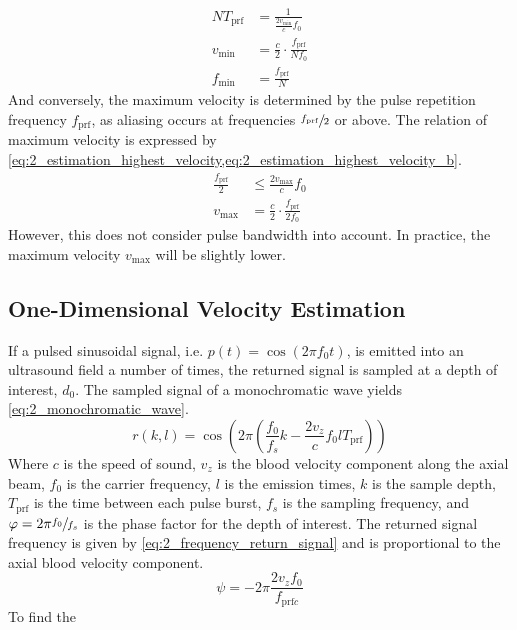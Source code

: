 \begin{subequations}
	\begin{align}
		N T_{\mathrm{prf}} &= \frac{1}{\frac{2v_{\mathrm{min}}}{c}f_{0}} \label{eq:2_estimation_lowest_velocity} \\
		v_{\mathrm{min}} &= \frac{c}{2}\cdot\frac{f_{\mathrm{prf}}}{N f_{0}} \label{eq:2_estimation_lowest_velocity_b} \\
		f_{\mathrm{min}} &= \frac{f_{\mathrm{prf}}}{N} \label{eq:2_estimation_lowest_frequency}
	\end{align}
\end{subequations}
And conversely, the maximum velocity is determined by the pulse repetition frequency $f_{\mathrm{prf}}$, as aliasing occurs at frequencies $\sfrac{f_{\mathrm{prf}}}{2}$ or above. The relation of maximum velocity is expressed by \cref{eq:2_estimation_highest_velocity,eq:2_estimation_highest_velocity_b}.
\begin{subequations}
	\begin{align}
		\frac{f_{\mathrm{prf}}}{2} &\le \frac{2v_{\mathrm{max}}}{c}f_{0} \label{eq:2_estimation_highest_velocity} \\
		v_{\mathrm{max}} &= \frac{c}{2}\cdot \frac{f_{\mathrm{prf}}}{2f_{0}} \label{eq:2_estimation_highest_velocity_b}
	\end{align}
\end{subequations}
However, this does not consider pulse bandwidth into account. In practice, the maximum velocity $v_{\mathrm{max}}$ will be slightly lower.
\subsection{One-Dimensional Velocity Estimation}
If a pulsed sinusoidal signal, i.e. $p(t)= \cos \left( 2\pi f_{0} t \right)$, is emitted into an ultrasound field a number of times, the returned signal is sampled at a depth of interest, $d_{0}$. The sampled signal of a \gls{monochromatic wave} yields \cref{eq:2_monochromatic_wave}.
\begin{equation} \label{eq:2_monochromatic_wave}
	r \left(k, l \right) = \cos \left( 2\pi \left( \frac{f_{0}}{f_{s}} k - \frac{2v_{z}}{c} f_{0} l T_{\mathrm{prf}} \right) \right)
\end{equation}
Where $c$ is the speed of sound, $v_{z}$ is the blood velocity component along the axial beam, $f_{0}$ is the carrier frequency, $l$ is the emission times, $k$ is the sample depth, $T_{\mathrm{prf}}$ is the time between each pulse burst, $f_{s}$ is the sampling frequency, and $\varphi = 2\pi \sfrac{f_{0}}{f_{s}}$ is the phase factor for the depth of interest. The returned signal frequency is given by \cref{eq:2_frequency_return_signal} and is proportional to the axial blood velocity component.
\begin{equation} \label{eq:2_frequency_return_signal}
	\psi = -2\pi \frac{2v_{z}f_{0}}{f_{\mathrm{prf}c}}
\end{equation}
To find the \cite{Pirnia_Thesis}

